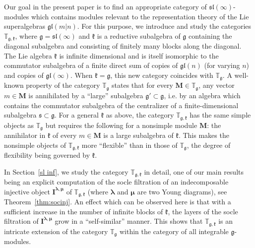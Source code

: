 \documentclass[12pt,oneside,english]{amsart}
\numberwithin{equation}{section}
\numberwithin{figure}{section}
\theoremstyle{plain}
\theoremstyle{plain}
\theoremstyle{remark}
\theoremstyle{definition}
\theoremstyle{plain}
\theoremstyle{remark}
\theoremstyle{definition}
\theoremstyle{plain}
\theoremstyle{plain}
\theoremstyle{definition}
\newcommand{\bI}{\mathbf{I}}
\newcommand{\bM}{\mathbf{M}}
\newcommand{\fg}{\mathfrak{g}}
\newcommand{\fk}{\mathfrak{k}}
\newcommand{\fs}{\mathfrak{s}}
\begin{document}
Our goal in the present paper is to find an appropriate category of $\mathfrak{sl}(\infty)$-modules which contains modules relevant to the representation theory of the Lie superalgebras $\mathfrak{gl}(m|n)$. For this purpose, we introduce and study the categories $\mathbb{T}_{\fg,\fk}$, where $\fg=\mathfrak{sl}(\infty)$ and $\fk$ is a reductive subalgebra of $\fg$ containing the diagonal subalgebra and consisting of finitely many blocks along the diagonal.  The Lie algebra $\fk$ is infinite dimensional and is itself isomorphic to the  commutator subalgebra of a finite direct sum of copies of $\mathfrak{gl}(n)$ (for varying $n$) and copies of $\mathfrak{gl}(\infty)$.
When $\fk=\fg$, this new category coincides with  $\mathbb{T}_{\fg}$. A well-known property of the category $\mathbb{T}_{\fg}$ states that for every $\bM\in\mathbb{T}_{\fg}$, any vector $m\in\bM$ is annihilated by a ``large'' subalgebra $\fg'\subset\fg$, i.e. by an algebra which contains  the commutator subalgebra of the centralizer of a finite-dimensional subalgebra $\fs\subset\fg$. For a general $\fk$ as above, the category $\mathbb{T}_{\fg,\fk}$ has the same simple objects as  $\mathbb{T}_{\fg}$ but requires the following for a nonsimple module $\bM$: the annihilator in $\fk$ of every $m\in\bM$ is a large subalgebra of $\fk$. This makes the nonsimple objects of  $\mathbb{T}_{\fg,\fk}$ more ``flexible'' than in those of  $\mathbb{T}_{\fg}$, the degree of flexibility being governed by $\fk$.

In Section~\ref{sl inf}, we study the category $\mathbb{T}_{\fg,\fk}$ in detail, one of our main results being an explicit computation of the socle filtration of an indecomposable injective object  $\bI^{\boldsymbol{\lambda},{\boldsymbol{\mu}}}$ of $\mathbb{T}_{\fg,\fk}$ (where $\boldsymbol{\lambda}$ and $\boldsymbol{\mu}$ are two Young diagrams), see Theorem~\ref{thm:socinj}. An effect which can be observed here is that with a sufficient increase in the number of infinite blocks of $\fk$, the layers of the socle filtration of $\bI^{\boldsymbol{\lambda},{\boldsymbol{\mu}}}$  grow in a ``self-similar'' manner. This shows that $\mathbb{T}_{\fg,\fk}$ is an intricate extension of the category  $\mathbb{T}_{\fg}$ within the category of all integrable $\fg$-modules.
\end{document}
